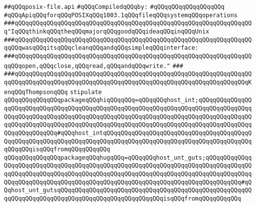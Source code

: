 \label{src/lib/std/src/psx/posix-file.api}
\verb|##qQQqposix-file.api|\newline
\newline
\verb|#qQQqCompiledqQQqby:|\newline
\verb|#qQQqqQQqqQQqqQQqqQQq|\newline
\newline
\newline
\newline
\newline
\verb|#qQQqApiqQQqforqQQqPOSIXqQQq1003.1qQQqfileqQQqsystemqQQqoperations|\newline
\newline
\newline
\newline
\verb|###qQQqqQQqqQQqqQQqqQQqqQQqqQQqqQQqqQQqqQQqqQQqqQQqqQQqqQQqqQQqqQQqqQQq"IqQQqthinkqQQqtheqQQqmajorqQQqgoodqQQqideaqQQqinqQQqUnix|\newline
\verb|###qQQqqQQqqQQqqQQqqQQqqQQqqQQqqQQqqQQqqQQqqQQqqQQqqQQqqQQqqQQqqQQqqQQqqQQqwasqQQqitsqQQqcleanqQQqandqQQqsimpleqQQqinterface:|\newline
\verb|###qQQqqQQqqQQqqQQqqQQqqQQqqQQqqQQqqQQqqQQqqQQqqQQqqQQqqQQqqQQqqQQqqQQqqQQqopen,qQQqclose,qQQqread,qQQqandqQQqwrite."|\newline
\verb|###|\newline
\verb|###qQQqqQQqqQQqqQQqqQQqqQQqqQQqqQQqqQQqqQQqqQQqqQQqqQQqqQQqqQQqqQQqqQQqqQQqqQQqqQQqqQQqqQQqqQQqqQQqqQQqqQQqqQQqqQQqqQQqqQQqqQQqqQQqqQQqqQQqKenqQQqThompsonqQQq|\newline
\newline
\newline
\newline
\verb|stipulate|\newline
\verb|qQQqqQQqqQQqqQQqpackageqQQqhiqQQqqQQq=qQQqqQQqhost_int;qQQqqQQqqQQqqQQqqQQqqQQqqQQqqQQqqQQqqQQqqQQqqQQqqQQqqQQqqQQqqQQqqQQqqQQqqQQqqQQqqQQqqQQqqQQqqQQqqQQqqQQqqQQqqQQqqQQqqQQqqQQqqQQqqQQqqQQqqQQqqQQqqQQqqQQqqQQqqQQqqQQqqQQqqQQqqQQqqQQqqQQqqQQqqQQqqQQqqQQqqQQqqQQqqQQqqQQqqQQqqQQqqQQqqQQqqQQqqQQq#qQQqhost_intqQQqqQQqqQQqqQQqqQQqqQQqqQQqqQQqqQQqqQQqqQQqqQQqqQQqqQQqqQQqqQQqqQQqqQQqqQQqqQQqqQQqqQQqqQQqqQQqqQQqqQQqqQQqqQQqqQQqqQQqisqQQqfromqQQqqQQqqQQq|\newline
\verb|qQQqqQQqqQQqqQQqpackageqQQqhugqQQq=qQQqqQQqhost_unt_guts;qQQqqQQqqQQqqQQqqQQqqQQqqQQqqQQqqQQqqQQqqQQqqQQqqQQqqQQqqQQqqQQqqQQqqQQqqQQqqQQqqQQqqQQqqQQqqQQqqQQqqQQqqQQqqQQqqQQqqQQqqQQqqQQqqQQqqQQqqQQqqQQqqQQqqQQqqQQqqQQqqQQqqQQqqQQqqQQqqQQqqQQqqQQqqQQqqQQqqQQqqQQqqQQqqQQqqQQqqQQq#qQQqhost_unt_gutsqQQqqQQqqQQqqQQqqQQqqQQqqQQqqQQqqQQqqQQqqQQqqQQqqQQqqQQqqQQqqQQqqQQqqQQqqQQqqQQqqQQqqQQqqQQqqQQqqQQqisqQQqfromqQQqqQQqqQQq|\newline
